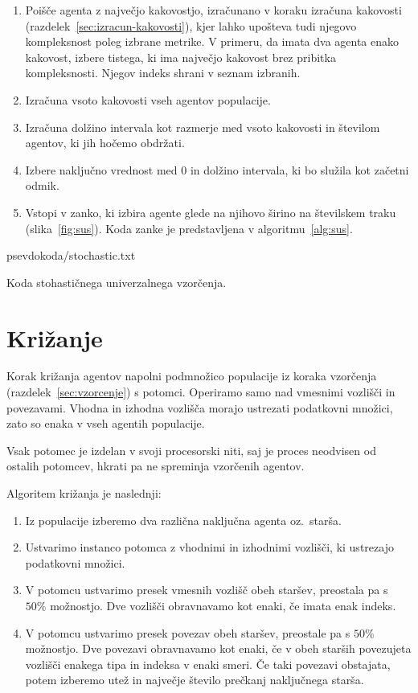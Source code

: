 \documentclass[a4paper,12pt,openright]{book}
\newcommand{\lstlistingslo}{}
\begin{document}
    \begin{enumerate}
        \item Poišče agenta z največjo kakovostjo, izračunano v koraku izračuna kakovosti (razdelek~\ref{sec:izracun-kakovosti}), kjer
        lahko upošteva tudi njegovo kompleksnost poleg izbrane metrike.
        V primeru, da imata dva agenta enako kakovost, izbere tistega, ki ima največjo kakovost brez pribitka kompleksnosti.
        Njegov indeks shrani v seznam izbranih.
        \item Izračuna vsoto kakovosti vseh agentov populacije.
        \item Izračuna dolžino intervala kot razmerje med vsoto kakovosti in številom agentov, ki jih hočemo obdržati.
        \item Izbere naključno vrednost med 0 in dolžino intervala, ki bo služila kot začetni odmik.
        \item Vstopi v zanko, ki izbira agente glede na njihovo širino na številskem traku (slika~\ref{fig:sus}).
        Koda zanke je predstavljena v algoritmu~\ref{alg:sus}.
    \end{enumerate}

    \newpage

    \begin{algorithm}[H]
        \lstlistingslo{psevdokoda/stochastic.txt}
        \caption{Koda stohastičnega univerzalnega vzorčenja.}
        \label{alg:sus}
    \end{algorithm}


    \section{Križanje}\label{sec:krizanje}
    Korak križanja agentov napolni podmnožico populacije iz koraka vzorčenja (razdelek~\ref{sec:vzorcenje}) s potomci.
    Operiramo samo nad vmesnimi vozlišči in povezavami.
    Vhodna in izhodna vozlišča morajo ustrezati podatkovni množici, zato so enaka v vseh agentih populacije.

    Vsak potomec je izdelan v svoji procesorski niti, saj je proces neodvisen od ostalih potomcev, hkrati pa ne
    spreminja vzorčenih agentov.

    Algoritem križanja je naslednji:
    \begin{enumerate}
        \item Iz populacije izberemo dva različna naključna agenta oz.\ starša.
        \item Ustvarimo instanco potomca z vhodnimi in izhodnimi vozlišči, ki ustrezajo podatkovni množici.
        \item V potomcu ustvarimo presek vmesnih vozlišč obeh staršev, preostala pa s $50\%$ možnostjo.
        Dve vozlišči obravnavamo kot enaki, če imata enak indeks.
        \item V potomcu ustvarimo presek povezav obeh staršev, preostale pa s $50\%$ možnostjo.
        Dve povezavi obravnavamo kot enaki, če v obeh starših povezujeta vozlišči enakega tipa in indeksa v enaki smeri.
        Če taki povezavi obstajata, potem izberemo utež in največje število prečkanj naključnega starša.
    \end{enumerate}
\end{document}
